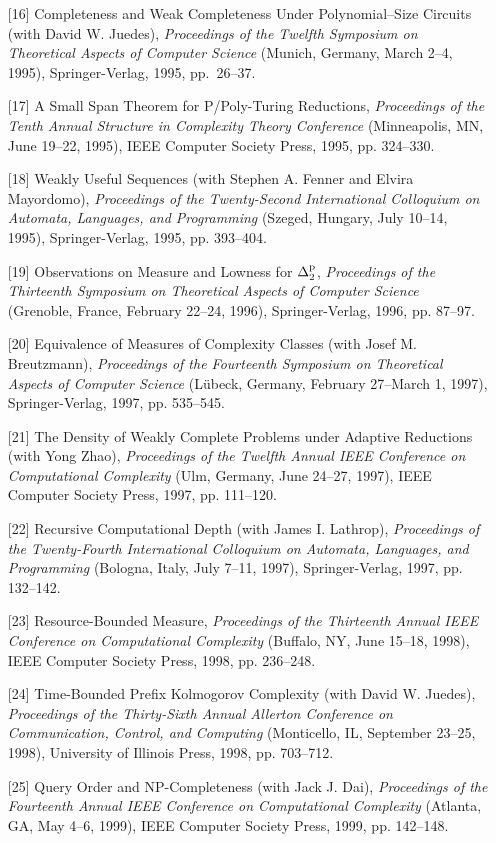 \begin{enumerate}
{of the Ninth Annual Structure in Complexity Theory Conference\/}
(Amsterdam, The Netherlands, June 28--July 1, 1994), IEEE Computer
Society Press, 1994, pp.~146--161.
\item[{[16]}] Completeness and Weak Completeness Under 
Polynomial--Size Circuits (with David W. Juedes),
{\it Proceedings of the Twelfth Symposium on Theoretical
Aspects of Computer Science\/} (Munich, Germany, March 2--4, 
1995), Springer-Verlag, 1995, pp.~26--37.
\item[{[17]}] A Small Span Theorem for P/Poly-Turing Reductions,
{\it Proceedings of the Tenth Annual Structure in Complexity
Theory Conference} (Minneapolis,
MN, June 19--22, 1995), IEEE Computer Society Press, 1995, pp. 324--330.
\item[{[18]}] Weakly Useful Sequences (with Stephen A. Fenner and
Elvira Mayordomo), {\it Proceedings of the Twenty-Second
International Colloquium on
Automata, Languages, and Programming} (Szeged, Hungary, July 10--14,
1995), Springer-Verlag, 1995, pp. 393--404.
\item[{[19]}] Observations on Measure and Lowness for
$\Delta^{\rm p}_{2}$, {\it Proceedings of the Thirteenth
Symposium on Theoretical Aspects of Computer Science} (Grenoble,
France, February 22--24, 1996), Springer-Verlag, 1996, pp. 87--97.
\item[{[20]}] Equivalence of Measures of Complexity Classes (with
Josef M. Breutzmann), {\it Proceedings of the Fourteenth Symposium 
on Theoretical Aspects of Computer Science} (L\"{u}beck, Germany,
February 27--March 1, 1997), Springer-Verlag, 1997, pp. 535--545.
\item[{[21]}] The Density of Weakly Complete Problems under
Adaptive Reductions (with Yong Zhao), {\it Proceedings of the 
Twelfth Annual IEEE Conference on Computational Complexity} 
(Ulm, Germany, June 24--27, 1997), IEEE Computer Society Press, 
1997, pp. 111--120.
\item[{[22]}] Recursive Computational Depth (with James I. Lathrop),
{\it Proceedings of the Twenty-Fourth International Colloquium on
Automata, Languages, and Programming} (Bologna, Italy, July 7--11, 
1997), Springer-Verlag, 1997, pp. 132--142.
\item[{[23]}] Resource-Bounded Measure, {\it Proceedings of the
Thirteenth Annual IEEE Conference on Computational Complexity}
(Buffalo, NY, June 15--18, 1998), IEEE Computer Society Press,
1998, pp. 236--248.
\item[{[24]}] Time-Bounded Prefix Kolmogorov Complexity
(with David W. Juedes), {\it Proceedings of the Thirty-Sixth Annual
Allerton Conference on Communication, Control, and Computing}
(Monticello, IL, September 23--25, 1998), University of Illinois
Press, 1998, pp. 703--712.
\item[{[25]}] Query Order and NP-Completeness (with Jack J. Dai),
{\it Proceedings of the Fourteenth Annual IEEE Conference on 
Computational Complexity} (Atlanta, GA, May 4--6, 1999), IEEE
Computer Society Press, 1999, pp. 142--148.
\end{enumerate}


